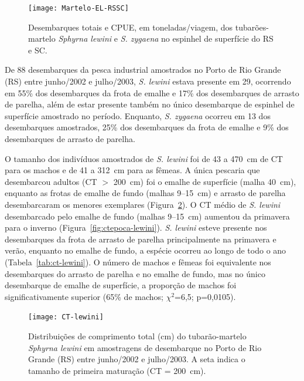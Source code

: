 \documentclass[a4paper,11pt,twoside,showtrims,onecolumn,openright,final]{memoir}
\begin{document}
%
%

\begin{figure}
\begin{center}
\texttt{[image: Martelo-EL-RSSC]}
\end{center}
\caption[Desembarques totais e CPUE dos tubarões-martelo no espinhel de superfície do RS e SC.]
        {Desembarques totais e CPUE, em toneladas/viagem, 
	 dos tubarões-martelo \emph{Sphyrna lewini} e \emph{S. zygaena} no espinhel de superfície do RS e SC.}
\label{fig:espinhel-martelo}
\end{figure}


De 88 desembarques da pesca industrial amostrados no Porto de Rio Grande (RS) 
entre junho/2002 e julho/2003, \emph{S. lewini} estava presente em 29, ocorrendo em 55\% 
dos desembarques da frota de emalhe e 17\% dos desembarques de arrasto de parelha, 
além de estar presente também no único desembarque de espinhel de superfície amostrado 
no período. Enquanto, \emph{S. zygaena} ocorreu em 13 dos desembarques amostrados, 25\% dos 
desembarques da frota de emalhe e 9\% dos desembarques de arrasto de parelha.

O tamanho dos indivíduos amostrados de \emph{S. lewini} foi de 43 a 470~cm de CT para 
os machos e de 41 a 312~cm para as fêmeas. A única pescaria que desembarcou 
adultos (CT $>$ 200~cm) foi o emalhe de superfície (malha 40~cm), enquanto as frotas de 
emalhe de fundo (malhas 9--15~cm) e arrasto de parelha desembarcaram os menores exemplares (Figura~\ref{fig:ct-lewini}). %
O CT médio de \emph{S. lewini} desembarcado pelo emalhe de fundo (malhas 9--15~cm) 
aumentou da primavera para o inverno (Figura~\ref{fig:ctepoca-lewini}). %
\emph{S. lewini} esteve presente nos desembarques da frota de arrasto de parelha principalmente 
na primavera e verão, enquanto no emalhe de fundo, a espécie ocorreu ao longo de todo o ano (Tabela~\ref{tab:ct-lewini}). 
O número de machos e fêmeas foi equivalente nos desembarques do arrasto de parelha e 
no emalhe de fundo, mas no único desembarque de emalhe de superfície, a proporção de machos 
foi significativamente superior (65\% de machos; $\chi^2$=6,5; p=0,0105).


%
%

\begin{figure}
\begin{center}
\texttt{[image: CT-lewini]}
\end{center}
\caption[Distribuições de comprimento total do tubarão-martelo \emph{Sphyrna lewini}.]
        {Distribuições de comprimento total (cm) do tubarão-martelo \emph{Sphyrna lewini}
         em amostragens de desembarque no Porto de Rio Grande (RS) entre junho/2002 e julho/2003.
	 A seta indica o tamanho de primeira maturação (CT = 200~cm).}
\label{fig:ct-lewini}
\end{figure}
\end{document}
